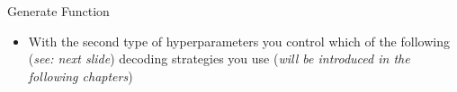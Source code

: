 \documentclass[11pt,compress,t,notes=noshow, xcolor=table]{beamer}
\begin{document}

\begin{frame}{Generate Function}

\begin{itemize}
    \begin{itemize}
        \item \texttt{min\_length}: The minimum length of the sequence to be generated. Corresponds to the length of the input prompt + \texttt{min\_new\_tokens}. Its effect is overridden by \texttt{min\_new\_tokens}, if also set
        \item \texttt{min\_new\_tokens}: The minimum numbers of tokens to generate, ignoring the number of tokens in the prompt
        \item \texttt{max\_time}: The maximum amount of time you allow the computation to run for in seconds. generation will still finish the current pass after allocated time has been passed
    \end{itemize}
    \item With the second type of hyperparameters you control which of the following (\textit{see: next slide}) decoding strategies you use (\textit{will be introduced in the following chapters})
\end{itemize}

\vfill
    
\end{frame}

\end{document}
